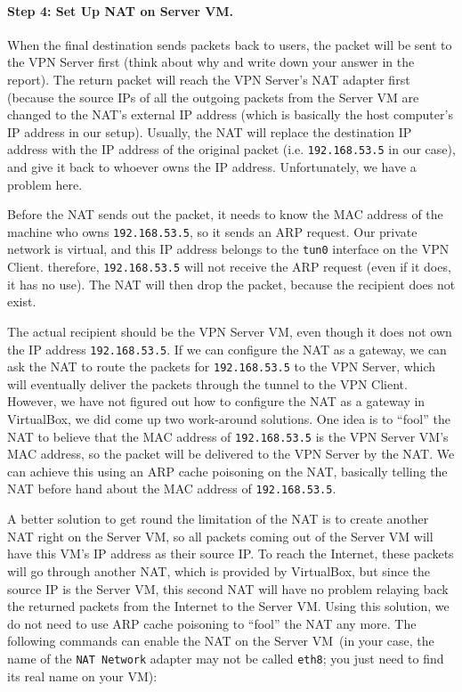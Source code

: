\paragraph{Step 4: Set Up NAT on Server VM.}
When the final destination sends packets back to users, the packet
will be sent to the VPN Server first (think about why and write down your answer 
in the report). The return packet will reach the VPN Server's NAT
adapter first (because the source IPs of all  the outgoing
packets from the Server VM are changed to the NAT's external IP address (which is basically the host computer's IP
address in our setup). Usually, the NAT will replace the destination IP address with the IP
address of the original packet (i.e. \texttt{192.168.53.5} in our case), and give it back to whoever owns
the IP address.  Unfortunately, we have a problem here.


Before the NAT sends out the packet, it needs to know the MAC address of the machine who owns
\texttt{192.168.53.5}, so it sends an ARP request. Our private network is virtual, and 
this IP address belongs to the \texttt{tun0} interface on the VPN Client.  
therefore, \texttt{192.168.53.5} will not receive the ARP request (even if it does, it has no
use). The NAT will then drop the packet, because the recipient does not exist.


The actual recipient should be the VPN Server VM, even though it does not own the IP address 
\texttt{192.168.53.5}.  If
we can configure the NAT as a gateway, we can ask the NAT to route the packets for
\texttt{192.168.53.5} to 
the VPN Server, which will eventually deliver the packets through the tunnel to the VPN Client. However,
we have not figured out how to configure the NAT as a gateway in VirtualBox, we did
come up two work-around solutions. One idea is to ``fool'' the NAT to believe that the MAC address of
\texttt{192.168.53.5} is the VPN Server VM's MAC address, so the packet will be delivered to
the VPN Server by the NAT. We can achieve this using an ARP cache poisoning on the NAT, basically telling the
NAT before hand about the MAC address of \texttt{192.168.53.5}.

A better solution to get round the limitation of the NAT is to create another NAT
right on the Server VM, so all packets coming out of the Server VM will have this VM's IP address as their source IP.
To reach the Internet, these packets will go through another NAT, which is provided by
VirtualBox, but since the source IP is the Server VM, this second NAT will have no problem relaying back
the returned packets from the Internet to the Server VM. Using this solution, we do not need to use ARP
cache poisoning to ``fool'' the NAT any more. The following commands can enable the NAT on
the Server VM~(in your case, the name of the \texttt{NAT Network} adapter may not be called 
\texttt{eth8}; you just need to find its real name on your VM):

